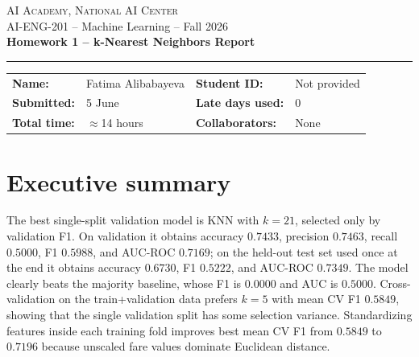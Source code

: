 \documentclass[10pt,a4paper]{article}
\begin{document}
\begin{center}
{\small \textsc{AI Academy, National AI Center} \\ AI-ENG-201 -- Machine Learning -- Fall 2026}\\[0.35em]
{\Large\bfseries Homework 1 -- k-Nearest Neighbors Report}\\[-0.1em]
\rule{0.86\textwidth}{0.4pt}
\end{center}

\begin{tabularx}{\textwidth}{@{}lXlX@{}}
\textbf{Name:} & Fatima Alibabayeva & \textbf{Student ID:} & Not provided \\
\textbf{Submitted:} & 5 June & \textbf{Late days used:} & 0 \\
\textbf{Total time:} & $\approx$14 hours & \textbf{Collaborators:} & None \\
\end{tabularx}

\smallskip
{}

\section*{Executive summary}
The best single-split validation model is KNN with $k=21$, selected only by validation F1. On validation it obtains accuracy $0.7433$, precision $0.7463$, recall $0.5000$, F1 $0.5988$, and AUC-ROC $0.7169$; on the held-out test set used once at the end it obtains accuracy $0.6730$, F1 $0.5222$, and AUC-ROC $0.7349$. The model clearly beats the majority baseline, whose F1 is $0.0000$ and AUC is $0.5000$. Cross-validation on the train+validation data prefers $k=5$ with mean CV F1 $0.5849$, showing that the single validation split has some selection variance. Standardizing features inside each training fold improves best mean CV F1 from $0.5849$ to $0.7196$ because unscaled fare values dominate Euclidean distance.
\end{document}
